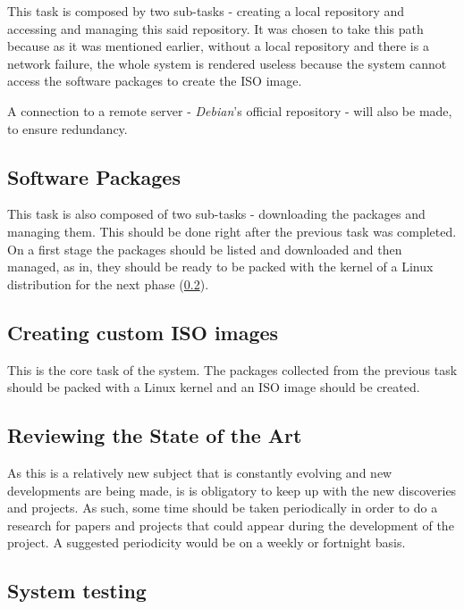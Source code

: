 This task is composed by two sub-tasks - creating a local repository and accessing and managing this said repository. It was chosen to take this path because as it was mentioned earlier, without a local repository and there is a network failure, the whole system is rendered useless because the system cannot access the software packages to create the ISO image.

A connection to a remote server - \textit{Debian}'s official repository - will also be made, to ensure redundancy.

\subsection{Software Packages}\label{tasks:packages}

This task is also composed of two sub-tasks - downloading the packages and managing them. This should be done right after the previous task was completed. On a first stage the packages should be listed and downloaded and then managed, as in, they should be ready to be packed with the kernel of a Linux distribution for the next phase (\ref{tasks:isos}).

\subsection{Creating custom ISO images}\label{tasks:isos}

This is the core task of the system. The packages collected from the previous task should be packed with a Linux kernel and an ISO image should be created.

\subsection{Reviewing the State of the Art}\label{tasks:sota}

As this is a relatively new subject that is constantly evolving and new developments are being made, is is obligatory to keep up with the new discoveries and projects. As such, some time should be taken periodically in order to do a research for papers and projects that could appear during the development of the project. A suggested periodicity would be on a weekly or fortnight basis.

\subsection{System testing}\label{tasks:test}

